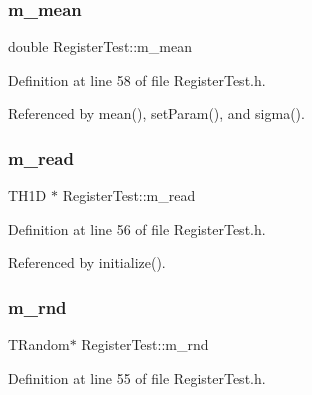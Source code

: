 \mbox{\label{classRegisterTest_aba5ac8088017236617d2244fc0c261b9}} 
\subsubsection{\texorpdfstring{m\+\_\+mean}{m\_mean}}
{\footnotesize\ttfamily double Register\+Test\+::m\+\_\+mean\hspace{0.3cm}{\ttfamily [private]}}



Definition at line 58 of file Register\+Test.\+h.



Referenced by mean(), set\+Param(), and sigma().

\mbox{\label{classRegisterTest_a5bb74853c26fdf7223244c569c64eb6d}} 
\subsubsection{\texorpdfstring{m\+\_\+read}{m\_read}}
{\footnotesize\ttfamily T\+H1D $\ast$ Register\+Test\+::m\+\_\+read\hspace{0.3cm}{\ttfamily [private]}}



Definition at line 56 of file Register\+Test.\+h.



Referenced by initialize().

\mbox{\label{classRegisterTest_a07e35817b07d61e54caa694d2a0fa210}} 
\subsubsection{\texorpdfstring{m\+\_\+rnd}{m\_rnd}}
{\footnotesize\ttfamily T\+Random$\ast$ Register\+Test\+::m\+\_\+rnd\hspace{0.3cm}{\ttfamily [private]}}



Definition at line 55 of file Register\+Test.\+h.



